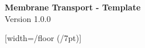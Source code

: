 \documentclass{article}
\begin{document}
\begin{Large}
      \begin{singlespace}
         \begin{center}
          \textbf{Membrane Transport - Template} \\
          Version 1.0.0
         \end{center} 
      \end{singlespace}
  \end{Large}
  
  \vspace*{10mm}

{
  [width=\pgfdecoratedpathlength/floor (\pgfdecoratedpathlength/7pt)]
  {
    \pgfpathmoveto{\pgfpoint{-1pt}{0pt}}
    \pgfpathlineto{\pgfpoint{-1pt}{-10pt}}
    \pgfpathmoveto{\pgfpoint{1pt}{0pt}}
    \pgfpathlineto{\pgfpoint{1pt}{-10pt}}
    \pgfpathmoveto{\pgfpoint{1pt}{0pt}}
    \pgfpathcircle{\pgfpoint{0pt}{2pt}}{2.5pt}
  }
  {
    \pgfpathmoveto{\pgfpointdecoratedpathlast}
  }
}
\end{document}
